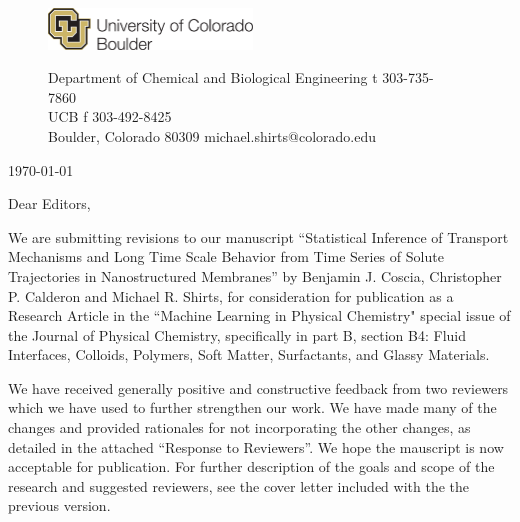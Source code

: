 \documentclass[fontsize=11pt]{article}
\begin{document}
	\graphicspath{{./figures/}}

	\begin{figure}
	\centering
	\begin{minipage}{0.37\textwidth}
	\includegraphics[width=2.14in,left]{CUBoulder.pdf}
	\end{minipage}
	\begin{minipage}{0.62\textwidth}
	\scriptsize
	\noindent Department of Chemical and Biological Engineering \hfill t 303-735-7860~~~~~~~~~~~~~~~~~~ \\
	 UCB \hfill f 303-492-8425~~~~~~~~~~~~~~~~~~ \\
	\noindent Boulder, Colorado 80309 \hfill michael.shirts@colorado.edu \\
	\end{minipage}
	\end{figure}
	
	\noindent \today

	\noindent Dear Editors,\\
	
	\newcommand{\ManuscriptTitle}{Statistical Inference of Transport Mechanisms and
	Long Time Scale Behavior from Time Series of Solute Trajectories in 
	Nanostructured Membranes}
	
	We are submitting revisions to our manuscript ``\ManuscriptTitle'' by Benjamin 
	J. Coscia, Christopher P. Calderon and Michael R. Shirts, for consideration for 
	publication as a Research Article in the ``Machine Learning in Physical Chemistry"
	special issue of the Journal of Physical Chemistry, specifically in part B, section
	B4: Fluid Interfaces, Colloids, Polymers, Soft Matter, Surfactants, and Glassy Materials.

	We have received generally positive and constructive feedback
        from two reviewers which we have used to further strengthen
        our work. We have made many of the changes and provided
        rationales for not incorporating the other changes, as
        detailed in the attached ``Response to Reviewers''. We hope
        the mauscript is now acceptable for publication. For further
        description of the goals and scope of the research and suggested
        reviewers, see the cover letter included with the the previous version.
\end{document}

